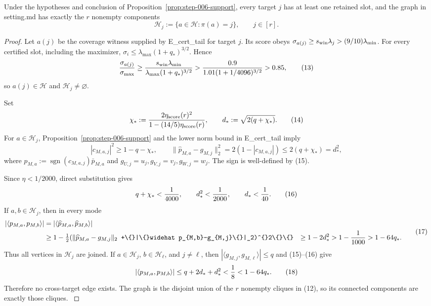 \begin{proposition}\label{prop:step-006-graph}
Under the hypotheses and conclusion of
Proposition~\ref{prop:step-006-support}, every target \(j\) has at least one
retained slot, and the graph in setting.md has exactly the \(r\) nonempty
components
\[
 \mathcal H_j:=\{a\in\mathcal H:\pi(a)=j\},\qquad j\in[r]. \tag{12}
\]

\begin{proof}
Let \(a(j)\) be the coverage witness supplied by E\_cert\_tail for
target \(j\). Its score obeys
\(\sigma_{a(j)}\ge s_{\rm win}\lambda_j>(9/10)\lambda_{\min}\).
For every certified slot, including the maximizer,
\(\sigma_i\le\lambda_{\max}(1+q_*)^{3/2}\). Hence
\[
 {\sigma_{a(j)}\over\sigma_{\max}}
 \ge {s_{\rm win}\lambda_{\min}\over
 \lambda_{\max}(1+q_*)^{3/2}}
 >{0.9\over1.01(1+1/4096)^{3/2}}>0.85, \tag{13}
\]
so \(a(j)\in\mathcal H\) and \(\mathcal H_j\ne\varnothing\).

Set
\[
 \chi_*:={2\eta_{\rm score}(r)^2\over
 1-(14/5)\eta_{\rm score}(r)},\qquad
 d_*:=\sqrt{2(q+\chi_*)}. \tag{14}
\]
For \(a\in\mathcal H_j\), Proposition~\ref{prop:step-006-support} and
the lower norm bound in E\_cert\_tail imply
\[
 |c_{M,a,j}|^2\ge1-q-\chi_*,\qquad
 \|\widehat p_{M,a}-g_{M,j}\|_2^2
 =2(1-|c_{M,a,j}|)\le2(q+\chi_*)=d_*^2, \tag{15}
\]
where \(\widehat p_{M,a}:=\operatorname{sgn}(c_{M,a,j})\bar p_{M,a}\) and
\(g_{U,j}=u_j,g_{V,j}=v_j,g_{W,j}=w_j\). The sign is well-defined by
(15).

Since \(\eta<1/2000\), direct substitution gives
\[
 q+\chi_*<{1\over4000},\qquad d_*^2<{1\over2000},\qquad d_*<{1\over40}. \tag{16}
\]
If \(a,b\in\mathcal H_j\), then in every mode
\[
 \begin{aligned}
 |\langle p_{M,a},p_{M,b}\rangle|
 &=|\langle\widehat p_{M,a},\widehat p_{M,b}\rangle|\\
 &\ge1-\tfrac12(\|\widehat p_{M,a}-g_{M,j}\|_2
\texttt{             +\textbackslash\{\}|\textbackslash\{\}widehat p\_\{M,b\}-g\_\{M,j\}\textbackslash\{\}|\_2)\textasciicircum\{\}2\textbackslash\{\}\textbackslash\{\}}
 &\ge1-2d_*^2>1-{1\over1000}>1-64q_*.
 \end{aligned} \tag{17}
\]
Thus all vertices in \(\mathcal H_j\) are joined. If \(a\in\mathcal H_j\),
\(b\in\mathcal H_\ell\), and \(j\ne\ell\), then
\(|\langle g_{M,j},g_{M,\ell}\rangle|\le q\) and (15)--(16) give
\[
 |\langle p_{M,a},p_{M,b}\rangle|
 \le q+2d_*+d_*^2<{1\over8}<1-64q_*.
 \tag{18}
\]
Therefore no cross-target edge exists. The graph is the disjoint union of
the \(r\) nonempty cliques in (12), so its connected components are exactly
those cliques. \(\)


\end{proof}
\end{proposition}
